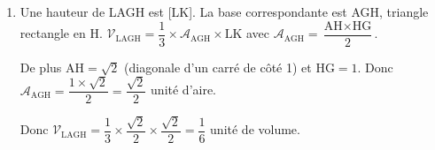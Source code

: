\documentclass[10pt]{article}
\providecommand{\vect}[1]{\overrightarrow{#1}}
\begin{document}
\begin{enumerate}
\begin{enumerate}
$\text{LK} = \left\|\vect{\text{LK}}\right\| = \sqrt{0^2+\left(-\dfrac12\right)^2+\left(\dfrac12\right)^2}=\sqrt{\dfrac12}=\dfrac{\sqrt2}{2}$  unité de longueur.
			\item Une hauteur de LAGH est [LK]. La base correspondante est AGH, triangle rectangle en H.  $\mathcal{V}_{\text{LAGH}}=\dfrac13\times \mathcal{A}_{\text{AGH}}\times \text{LK}$ avec $\mathcal{A}_{\text{AGH}}=\dfrac{\text{AH}\times \text{HG}}{2}$.

De plus $\text{AH} =\sqrt{2}$ (diagonale d'un carré de côté 1) et $\text{HG} =1$. Donc $\mathcal{A}_{\text{AGH}}=\dfrac{1 \times \sqrt{2}}{2}=\dfrac{\sqrt2}{2}$ unité d'aire.

Donc $\mathcal{V}_{\text{LAGH}}=\dfrac13\times \dfrac{\sqrt2}{2}\times \dfrac{\sqrt2}{2}=\dfrac{1}{6}$ unité de volume.
		\end{enumerate}
\end{enumerate}

\bigskip
\end{document}
